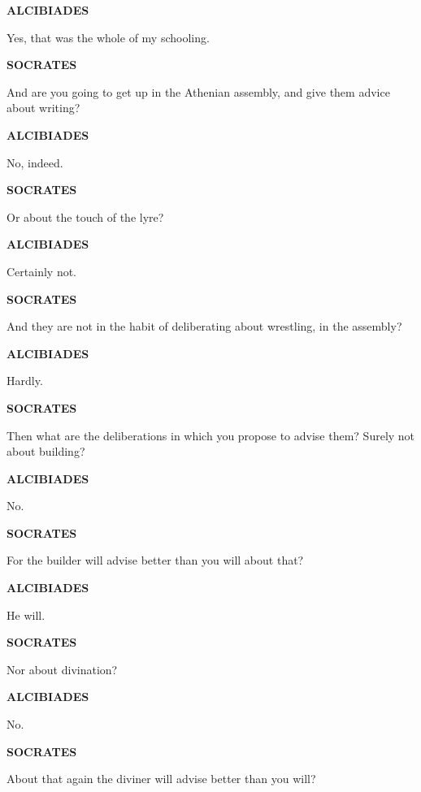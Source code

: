 \documentclass[11pt,letter]{article}
\begin{document}
\par \textbf{ALCIBIADES}
\par   Yes, that was the whole of my schooling.

\par \textbf{SOCRATES}
\par   And are you going to get up in the Athenian assembly, and give them advice about writing?

\par \textbf{ALCIBIADES}
\par   No, indeed.

\par \textbf{SOCRATES}
\par   Or about the touch of the lyre?

\par \textbf{ALCIBIADES}
\par   Certainly not.

\par \textbf{SOCRATES}
\par   And they are not in the habit of deliberating about wrestling, in the assembly?

\par \textbf{ALCIBIADES}
\par   Hardly.

\par \textbf{SOCRATES}
\par   Then what are the deliberations in which you propose to advise them? Surely not about building?

\par \textbf{ALCIBIADES}
\par   No.

\par \textbf{SOCRATES}
\par   For the builder will advise better than you will about that?

\par \textbf{ALCIBIADES}
\par   He will.

\par \textbf{SOCRATES}
\par   Nor about divination?

\par \textbf{ALCIBIADES}
\par   No.

\par \textbf{SOCRATES}
\par   About that again the diviner will advise better than you will?
\end{document}
